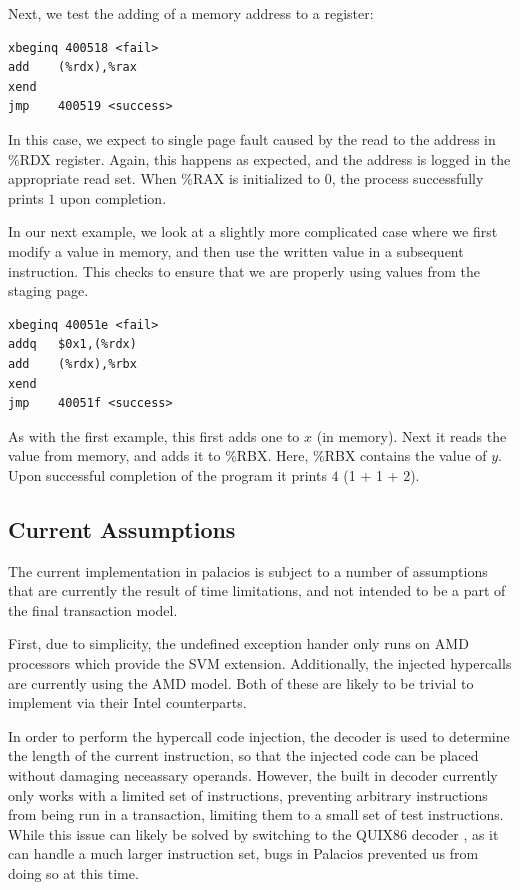 \documentclass{acm_proc_article-sp}
\begin{document}
Next, we test the adding of a memory address to a register:

\begin{verbatim}
xbeginq 400518 <fail>
add    (%rdx),%rax
xend   
jmp    400519 <success>
\end{verbatim}

In this case, we expect to single page fault caused by the read to the address
in \%RDX register. Again, this happens as expected, and the address is logged
in the appropriate read set. When \%RAX is initialized to 0, the process 
successfully prints $1$ upon completion.


In our next example, we look at a slightly more complicated case where we first
modify a value in memory, and then use the written value in a subsequent
instruction. This checks to ensure that we are properly using values from the
staging page. 

\begin{verbatim}
xbeginq 40051e <fail>
addq   $0x1,(%rdx)
add    (%rdx),%rbx
xend   
jmp    40051f <success>
\end{verbatim}

As with the first example, this first adds one to $x$ (in memory). Next it reads
the value from memory, and adds it to \%RBX. Here, \%RBX contains the value of $y$.
Upon successful completion of the program it prints $4$ ({1 + 1 + 2}).



\subsection{Current Assumptions}

The current implementation in palacios is subject to a number of assumptions
that are currently the result of time limitations, and not intended to be a
part of the final transaction model.

First, due to simplicity, the undefined exception hander only runs on AMD 
processors which provide the SVM extension. Additionally, the injected 
hypercalls are currently using the AMD model. Both of these are likely to be
trivial to implement via their Intel counterparts.  

In order to perform the hypercall code injection, the decoder is used to 
determine the length of the current instruction, so that the injected code
can be placed without damaging neceassary operands. However, the built in
decoder currently only works with a limited set of instructions, preventing
arbitrary instructions from being run in a transaction, limiting them to a 
small set of test instructions. While this issue can likely be solved by 
switching to the QUIX86 decoder \cite{quix86site}, as it can handle a much larger
instruction set, bugs in Palacios prevented us from doing so at this time.
\end{document}

